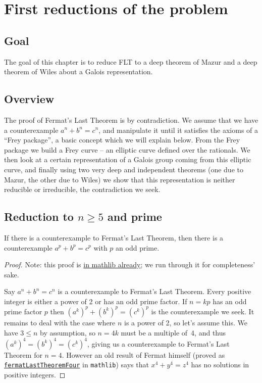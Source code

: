 \chapter{First reductions of the problem}\label{ch_reductions}

\section{Goal}

The goal of this chapter is to reduce FLT to a deep theorem of Mazur and a deep theorem of Wiles
about a Galois representation.

\section{Overview}
The proof of Fermat's Last Theorem is by contradiction. We assume that we have a counterexample
$a^n+b^n=c^n$, and manipulate it until it satisfies the axioms of a ``Frey package'', a basic
concept which we will explain below. From the
Frey package we build a Frey curve -- an elliptic curve defined over the rationals. We then look at
a certain representation of a Galois group coming from this elliptic curve, and finally using two
very deep and independent theorems (one due to Mazur, the other due to Wiles) we show that this
representation is neither reducible or irreducible, the contradiction we seek.

\section{Reduction to \texorpdfstring{$n\geq5$}{ngeq5} and prime}

\begin{lemma}\label{FermatLastTheorem.of_odd_primes}\leanok
  If there is a counterexample to Fermat's Last Theorem, then there is a counterexample $a^p+b^p=c^p$
  with $p$ an odd prime.
\end{lemma}
\begin{proof}\leanok
  Note: this proof is \href{https://leanprover-community.github.io/mathlib4_docs/Mathlib/NumberTheory/FLT/Four.html#FermatLastTheorem.of_odd_primes}{in mathlib already};
  we run through it for completeness' sake.

  Say $a^n + b^n = c^n$ is a counterexample to Fermat's Last Theorem. Every positive integer is either
  a power of 2 or has an odd prime factor. If $n=kp$ has an odd prime factor $p$ then
  $(a^k)^p+(b^k)^p=(c^k)^p$ is the counterexample we seek. It remains to deal with the case where
  $n$ is a power of 2, so let's assume this. We have $3\leq n$ by assumption, so
  $n=4k$ must be a multiple of~4, and thus $(a^k)^4=(b^k)^4=(c^k)^4$, giving us a counterexample
  to Fermat's Last Theorem for $n=4$. However an old result of Fermat himself (proved as
  \href{https://leanprover-community.github.io/mathlib4_docs/Mathlib/NumberTheory/FLT/Four.html#fermatLastTheoremFour}{\tt fermatLastTheoremFour}
  in {\tt mathlib}) says that $x^4+y^4=z^4$ has no solutions in positive integers.
\end{proof}

